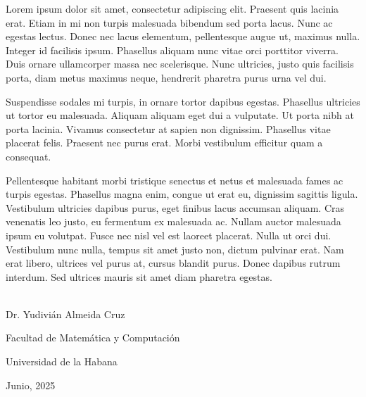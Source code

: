 \begin{opinion}
Lorem ipsum dolor sit amet, consectetur adipiscing elit. Praesent quis lacinia erat. Etiam in mi non turpis malesuada bibendum sed porta lacus. Nunc ac egestas lectus. Donec nec lacus elementum, pellentesque augue ut, maximus nulla. Integer id facilisis ipsum. Phasellus aliquam nunc vitae orci porttitor viverra. Duis ornare ullamcorper massa nec scelerisque. Nunc ultricies, justo quis facilisis porta, diam metus maximus neque, hendrerit pharetra purus urna vel dui.

Suspendisse sodales mi turpis, in ornare tortor dapibus egestas. Phasellus ultricies ut tortor eu malesuada. Aliquam aliquam eget dui a vulputate. Ut porta nibh at porta lacinia. Vivamus consectetur at sapien non dignissim. Phasellus vitae placerat felis. Praesent nec purus erat. Morbi vestibulum efficitur quam a consequat.

Pellentesque habitant morbi tristique senectus et netus et malesuada fames ac turpis egestas. Phasellus magna enim, congue ut erat eu, dignissim sagittis ligula. Vestibulum ultricies dapibus purus, eget finibus lacus accumsan aliquam. Cras venenatis leo justo, eu fermentum ex malesuada ac. Nullam auctor malesuada ipsum eu volutpat. Fusce nec nisl vel est laoreet placerat. Nulla ut orci dui. Vestibulum nunc nulla, tempus sit amet justo non, dictum pulvinar erat. Nam erat libero, ultrices vel purus at, cursus blandit purus. Donec dapibus rutrum interdum. Sed ultrices mauris sit amet diam pharetra egestas. 

\vspace{1cm}


\begin{flushright}
    \underline{\hspace{6.5cm}}\\
    Dr. Yudivián Almeida Cruz
    
    Facultad de Matemática y Computación
    
    Universidad de la Habana
    
    Junio, 2025
\end{flushright}

\end{opinion}